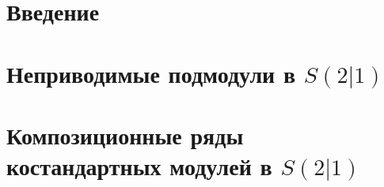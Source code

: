 \section*{Введение}
	

%	
%	

\section{Неприводимые подмодули в $S(2|1)$}
	
	
\section{Композиционные ряды костандартных модулей в $S(2|1)$}
	